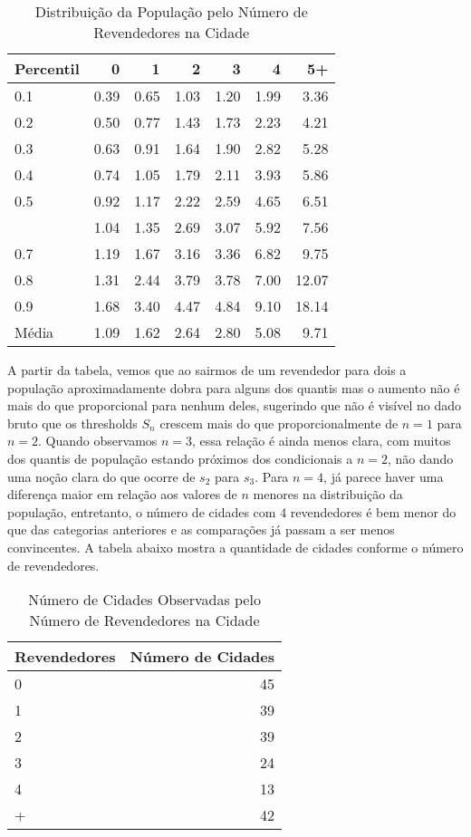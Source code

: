 \documentclass[
  12pt,
]{article}
\begin{document}
\begin{table}[H]

\caption{\label{tab:unnamed-chunk-3}Distribuição da População pelo Número de Revendedores na Cidade}
\centering
\begin{tabular}[t]{lrrrrrr}
\toprule
Percentil & 0 & 1 & 2 & 3 & 4 & 5+\\
\midrule
0.1 & 0.39 & 0.65 & 1.03 & 1.20 & 1.99 & 3.36\\
0.2 & 0.50 & 0.77 & 1.43 & 1.73 & 2.23 & 4.21\\
0.3 & 0.63 & 0.91 & 1.64 & 1.90 & 2.82 & 5.28\\
0.4 & 0.74 & 1.05 & 1.79 & 2.11 & 3.93 & 5.86\\
0.5 & 0.92 & 1.17 & 2.22 & 2.59 & 4.65 & 6.51\\
\addlinespace
0.6 & 1.04 & 1.35 & 2.69 & 3.07 & 5.92 & 7.56\\
0.7 & 1.19 & 1.67 & 3.16 & 3.36 & 6.82 & 9.75\\
0.8 & 1.31 & 2.44 & 3.79 & 3.78 & 7.00 & 12.07\\
0.9 & 1.68 & 3.40 & 4.47 & 4.84 & 9.10 & 18.14\\
Média & 1.09 & 1.62 & 2.64 & 2.80 & 5.08 & 9.71\\
\bottomrule
\end{tabular}
\end{table}

A partir da tabela, vemos que ao sairmos de um revendedor para dois a
população aproximadamente dobra para alguns dos quantis mas o aumento
não é mais do que proporcional para nenhum deles, sugerindo que não é
visível no dado bruto que os thresholds \(S_n\) crescem mais do que
proporcionalmente de \(n=1\) para \(n=2\). Quando observamos \(n=3\),
essa relação é ainda menos clara, com muitos dos quantis de população
estando próximos dos condicionais a \(n=2\), não dando uma noção clara
do que ocorre de \(s_2\) para \(s_3\). Para \(n=4\), já parece haver uma
diferença maior em relação aos valores de \(n\) menores na distribuição
da população, entretanto, o número de cidades com 4 revendedores é bem
menor do que das categorias anteriores e as comparações já passam a ser
menos convincentes. A tabela abaixo mostra a quantidade de cidades
conforme o número de revendedores.

\begin{table}[H]

\caption{\label{tab:unnamed-chunk-4}Número de Cidades Observadas pelo Número de Revendedores na Cidade}
\centering
\begin{tabular}[t]{lr}
\toprule
Revendedores & Número de Cidades\\
\midrule
0 & 45\\
1 & 39\\
2 & 39\\
3 & 24\\
4 & 13\\
\addlinespace
5+ & 42\\
\bottomrule
\end{tabular}
\end{table}
\end{document}
